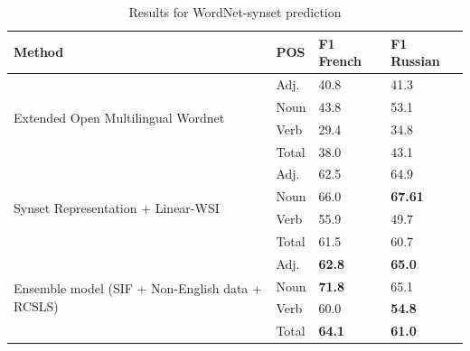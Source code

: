 \documentclass[11pt,a4paper]{article}
\begin{document}
\begin{table}[!htb]
	\small
	\caption{Results for WordNet-synset prediction}
	\label{wordnet-results}		
	\centering
	\begin{tabular}{l l l l}
		Method & POS & F1 French & F1 Russian
		\\
		\hline
		\multirow{4}{*}{Extended Open Multilingual Wordnet \newline \cite{bond-wordnet}}
		& \multicolumn{1}{l}{Adj.} & \multicolumn{1}{l}{40.8} & \multicolumn{1}{l}{41.3} \\
		& \multicolumn{1}{l}{Noun} & \multicolumn{1}{l}{43.8} & \multicolumn{1}{l}{53.1} \\
		& \multicolumn{1}{l}{Verb} & \multicolumn{1}{l}{29.4} & \multicolumn{1}{l}{34.8} \\
		& \multicolumn{1}{l}{Total} & \multicolumn{1}{l}{38.0} & \multicolumn{1}{l}{43.1} \\
		\hline
		\multirow{4}{*}{Synset Representation + Linear-WSI \cite{Khodak2017}}
		& \multicolumn{1}{l}{Adj.} & \multicolumn{1}{l}{62.5} & \multicolumn{1}{l}{64.9} \\
		& \multicolumn{1}{l}{Noun} & \multicolumn{1}{l}{66.0} & \multicolumn{1}{l}{\textbf{67.61}} \\
		& \multicolumn{1}{l}{Verb} & \multicolumn{1}{l}{55.9} & \multicolumn{1}{l}{49.7} \\
		& \multicolumn{1}{l}{Total} & \multicolumn{1}{l}{61.5} & \multicolumn{1}{l}{60.7} \\
		
		\hline
		\multirow{4}{*}{Ensemble model (SIF + Non-English data + RCSLS)}
		& \multicolumn{1}{l}{Adj.} & \multicolumn{1}{l}{\textbf{62.8}} & \multicolumn{1}{l}{\textbf{65.0}} \\
		& \multicolumn{1}{l}{Noun} & \multicolumn{1}{l}{\textbf{71.8}} & \multicolumn{1}{l}{65.1} \\
		& \multicolumn{1}{l}{Verb} & \multicolumn{1}{l}{60.0} & \multicolumn{1}{l}{\textbf{54.8}} \\
		& \multicolumn{1}{l}{Total} & \multicolumn{1}{l}{\textbf{64.1}} & \multicolumn{1}{l}{\textbf{61.0}} \\
		

\end{tabular}
\end{table}
\end{document}

